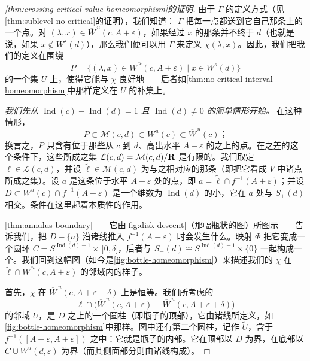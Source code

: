 \begin{proof}[\cref{thm:crossing-critical-value-homeomorphism}的证明]
由于 $\varGamma$ 的定义方式（见\cref{thm:sublevel-no-critical}的证明），我们知道：\trDiffeomorphism{} $\varGamma$ 把每一点都送到它自己那条\trTrajectory{}上的一个点。对 $(\lambda,x)\in\overline{W}^{\,u}(c,A+\varepsilon)$，如果经过 $x$ 的那条\trTrajectory{}并不终于 $d$（也就是说，如果 $x\notin W^s(d)$），那么我们便可以用 $\varGamma$ 来定义 $\chi(\lambda,x)$。因此，我们把我们的\trHomeomorphism{}定义在围绕
\[
P=\bigl\{(\lambda,x)\in\overline{W}^{\,u}(c,A+\varepsilon)\mid x\in W^s(d)\bigr\}
\]
的一个\trOpen{}集 $U$ 上，使得它能与\trHomeomorphism{} $\chi$ 良好地\trGluing——后者如\cref{thm:no-critical-interval-homeomorphism}中那样定义在 $U$ 的补集上。

\emph{我们先从 $\operatorname{Ind}(c)-\operatorname{Ind}(d)=1$ 且 $\operatorname{Ind}(d)\neq 0$ 的简单情形开始。}
在这种情形，
\[
P\subset\mathcal{M}(c,d)\subset W^u(c)\subset\overline{W}^{\,u}(c)\text{；}
\]
换言之，$P$ 只含有位于那些从 $c$ 到 $d$、高出水平 $A+\varepsilon$ 的\trTrajectory{}之上的点。在\trIndex{}之差的这个条件下，这些\trTrajectory{}所成之集 $\mathcal{L}(c,d)=\mathcal{M}(c,d)/\mathbf{R}$ 是有限的。我们取定 $\ell\in\mathcal{L}(c,d)$，并设 $\tilde{\ell}\in\mathcal{M}(c,d)$ 为与之相对应的那条\trTrajectory（即把它看成 $V$ 中诸点所成之集）。设 $a$ 是这条\trTrajectory{}位于水平 $A+\varepsilon$ 处的点，即 $a=\tilde{\ell}\cap f^{-1}(A+\varepsilon)$；并设 $D\subset W^u(c)\cap f^{-1}(A+\varepsilon)$ 是一个维数为 $\operatorname{Ind}(d)$ 的小\trDisk，它在 $a$ 处与 $S_+(d)$ \trTransverse{}相交。\trSmale{}条件在这里起着本质性的作用。

\cref{thm:annulus-boundary}——它由\cref{fig:disk-descent}（那幅瓶状的图）所图示——告诉我们，把 $D-\{a\}$ 沿诸\trGradient{}线推入\trLevelSet{} $f^{-1}(A-\varepsilon)$ 时会发生什么。映射 $\varPhi$ 把它变成一个圆环 $C=S^{\operatorname{Ind}(d)-1}\times\,]0,\delta]$，后者与 $S_-(d)\cong S^{\operatorname{Ind}(d)-1}\times\{0\}$ 一起构成一个\trManifoldWithBoundary。我们回到这幅图（如今是\cref{fig:bottle-homeomorphism}）来描述我们的\trHomeomorphism{} $\chi$ 在 $\tilde{\ell}\cap\overline{W}^{\,u}(c,A+\varepsilon)$ 的邻域内的样子。

首先，$\chi$ 在 $\overline{W}^{\,u}(c,A+\varepsilon+\delta)$ 上是恒等。我们所考虑的
\[
\tilde{\ell}\cap\bigl(\overline{W}^{\,u}(c,A+\varepsilon)-\overline{W}^{\,u}(c,A+\varepsilon+\delta)\bigr)
\]
的邻域 $U$，是 $D$ 之上的一个圆柱（即瓶子的顶部），它由诸\trGradient{}线所定义，如\cref{fig:bottle-homeomorphism}中那样。图中还有第二个圆柱，记作 $\widetilde{U}$，含于 $f^{-1}([A-\varepsilon,A+\varepsilon])$ 之中：它就是瓶子的内部。它在顶部以 $D$ 为界，在底部以 $C\cup W^u(d,\varepsilon)$ 为界（而其侧面部分则由诸\trGradient{}线构成）。


\end{proof}
